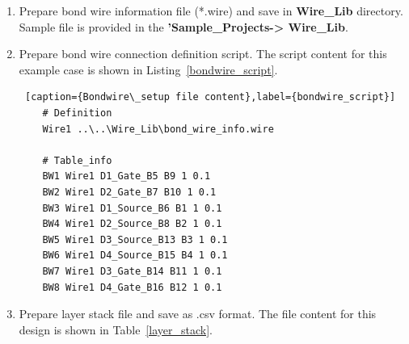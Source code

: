 \documentclass[11pt]{article}
\begin{document}
\begin{enumerate}
\begin{lstlisting} [caption={Layout\_script for the layout shown in Fig.~\ref{init_layout}},label={input_script}]
    #Layout Information
    45 50
    + T1 power 2 2 40 6 4
    	+ B1 power 10 6 1 1 5
    	+ B2 power 18 6 1 1 5
    	+ L1 power_lead 4 3 5
    + T2 power 2 10 30 8 4
    - T3 power 32 10 10 32 4
    - T4 power 2 42 40 4 4
    	+ B3 power 16 43 1 1 5
    	+ B4 power 24 43 1 1 5
    	+ L2 power_lead 36 26 5
    	+ D1 MOS 8 11 5
    		+ B5 signal 10 15 1 1 5
    		+ B6 power 10 12 1 1 5
    	+ D2 MOS 17 11 5
    		+ B7 signal 18 15 1 1 5
    		+ B8 power 18 12 1 1 5
    + T5 signal 2 20 26 4 4
    	+ B9 signal 10 21 1 1 5
    	+ B10 signal 18 21 1 1 5
    	+ L3 signal_lead 4 21 5
    + T6 signal 2 26 26 4 4
    	+ B11 signal 16 28 1 1 5
    	+ B12 signal 24 28 1 1 5
    	+ L4 signal_lead 4 27 5
    + T10 power 2 32 26 8 4
    	+ L5 power_lead 4 34 5
    	+ D3 MOS 14 33 5
    		+ B13 power 16 37 1 1 5
    		+ B14 signal 16 34 1 1 5
    	+ D4 MOS 22 33 5
    		+ B15 power 24 37 1 1 5
    		+ B16 signal 24 34 1 1 5

    
    \end{lstlisting}
    
    
    
    
    \item Prepare bond wire information file (*.wire) and save in \textbf{Wire\_Lib} directory. Sample file is provided in the \textbf{'Sample\_Projects-> Wire\_Lib}.
    
    \item Prepare bond wire connection definition script. The script content for this example case is shown in Listing~\ref{bondwire_script}.
    
    \begin{lstlisting} [caption={Bondwire\_setup file content},label={bondwire_script}]
    # Definition
    Wire1 ..\..\Wire_Lib\bond_wire_info.wire
    
    # Table_info
    BW1 Wire1 D1_Gate_B5 B9 1 0.1
    BW2 Wire1 D2_Gate_B7 B10 1 0.1
    BW3 Wire1 D1_Source_B6 B1 1 0.1
    BW4 Wire1 D2_Source_B8 B2 1 0.1
    BW5 Wire1 D3_Source_B13 B3 1 0.1
    BW6 Wire1 D4_Source_B15 B4 1 0.1
    BW7 Wire1 D3_Gate_B14 B11 1 0.1
    BW8 Wire1 D4_Gate_B16 B12 1 0.1

    \end{lstlisting}
    
    \item Prepare layer stack file and save as .csv format. The file content for this design is shown in Table~\ref{layer_stack}.

    

\end{enumerate}
\end{document}
